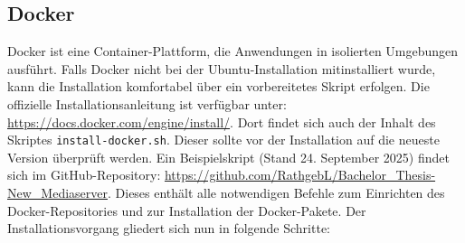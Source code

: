 \documentclass[12pt,a4paper]{report}
\begin{document}
  \subsection{Docker}  
  Docker ist eine Container-Plattform, die Anwendungen in isolierten Umgebungen ausführt. 
  Falls Docker nicht bei der Ubuntu-Installation mitinstalliert wurde, kann die Installation komfortabel über ein vorbereitetes Skript erfolgen. 
  Die offizielle Installationsanleitung ist verfügbar unter: \url{https://docs.docker.com/engine/install/}.  
  Dort findet sich auch der Inhalt des Skriptes \texttt{install-docker.sh}. Dieser sollte vor der Installation auf die neueste Version überprüft werden. 
  Ein Beispielskript (Stand 24. September 2025) findet sich im GitHub-Repository: \url{https://github.com/RathgebL/Bachelor_Thesis-New_Mediaserver}.
  Dieses enthält alle notwendigen Befehle zum Einrichten des Docker-Repositories und zur Installation der Docker-Pakete.
  Der Installationsvorgang gliedert sich nun in folgende Schritte:  
\end{document}
